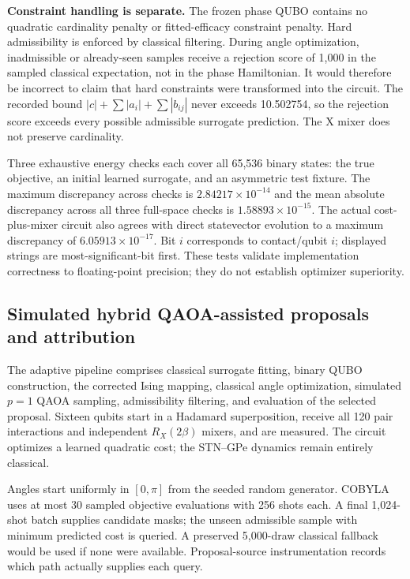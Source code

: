 \documentclass[11pt,letterpaper]{article}
\begin{document}
\textbf{Constraint handling is separate.} The frozen phase QUBO contains no quadratic cardinality penalty or fitted-efficacy constraint penalty. Hard admissibility is enforced by classical filtering. During angle optimization, inadmissible or already-seen samples receive a rejection score of 1,000 in the sampled classical expectation, not in the phase Hamiltonian. It would therefore be incorrect to claim that hard constraints were transformed into the circuit. The recorded bound $|c|+\sum|a_i|+\sum|b_{ij}|$ never exceeds 10.502754, so the rejection score exceeds every possible admissible surrogate prediction. The X mixer does not preserve cardinality.

Three exhaustive energy checks each cover all 65,536 binary states: the true objective, an initial learned surrogate, and an asymmetric test fixture. The maximum discrepancy across checks is $2.84217\times10^{-14}$ and the mean absolute discrepancy across all three full-space checks is $1.58893\times10^{-15}$. The actual cost-plus-mixer circuit also agrees with direct statevector evolution to a maximum discrepancy of $6.05913\times10^{-17}$. Bit $i$ corresponds to contact/qubit $i$; displayed strings are most-significant-bit first. These tests validate implementation correctness to floating-point precision; they do not establish optimizer superiority.

\subsection{Simulated hybrid QAOA-assisted proposals and attribution}
The adaptive pipeline comprises classical surrogate fitting, binary QUBO construction, the corrected Ising mapping, classical angle optimization, simulated $p=1$ QAOA sampling, admissibility filtering, and evaluation of the selected proposal. Sixteen qubits start in a Hadamard superposition, receive all 120 pair interactions and independent $R_X(2\beta)$ mixers, and are measured. The circuit optimizes a learned quadratic cost; the STN--GPe dynamics remain entirely classical.

Angles start uniformly in $[0,\pi]$ from the seeded random generator. COBYLA uses at most 30 sampled objective evaluations with 256 shots each. A final 1,024-shot batch supplies candidate masks; the unseen admissible sample with minimum predicted cost is queried. A preserved 5,000-draw classical fallback would be used if none were available. Proposal-source instrumentation records which path actually supplies each query.
\end{document}
